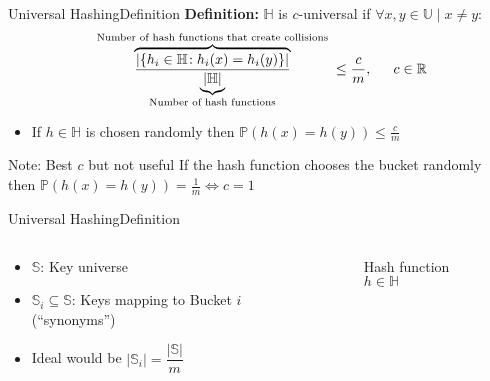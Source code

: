 
\begin{frame}{Universal Hashing}{Definition}
  \textbf{Definition:}
  $\mathbb{H}$ is {\color{Mittel-Blau}$c$-universal} if
  $\forall x, y \in \mathbb{U} \mid x \neq y:$
  \begin{displaymath}
    \overbrace{
      \frac{
        \vert \{h_i \in \mathbb{H}\!: h_i(x) = h_i(y)\} \vert
      }{
      \underbrace{\vert \mathbb{H} \vert}_\text{Number of hash functions}
      }
    }^\text{
      Number of hash functions that create collisions
    }
    \leq \frac{c}{m}, \hspace*{1.5em} c \in \mathbb{R}
  \end{displaymath}
  \begin{itemize}
    \item
      If $h \in \mathbb{H}$ is chosen randomly then
      $\mathbb{P}(h(x) = h(y)) \leq \frac{c}{m}$
  \end{itemize}
  \begin{block}{Note: Best $c$ but not useful}
    If the hash function chooses the {\color{Mittel-Blau}bucket} 
    randomly then
    $\mathbb{P}(h(x) = h(y)) = \frac{1}{m} \Leftrightarrow c = 1$
  \end{block}
\end{frame}


\begin{frame}{Universal Hashing}{Definition}
  \begin{columns}
    \begin{column}{0.5\linewidth}
      \begin{itemize}
        \item
          $\mathbb{S}$:
          Key universe
        \item
          $\mathbb{S}_i \subseteq \mathbb{S}$:
          Keys mapping to Bucket $i$ (\enquote{synonyms})
       \item
         Ideal would be
         $\vert \mathbb{S}_i \vert =\dfrac{\vert \mathbb{S} \vert}{m}$
      \end{itemize}
    \end{column}
    \begin{column}{0.5\linewidth}
      \begin{figure}[!h]%
        \begin{adjustbox}{width=\linewidth}%
        \end{adjustbox}
        \caption{Hash function $h \in \mathbb{H}$}%
        \label{fig:universal_hashing:hash_function_to_bucket}
      \end{figure}
    \end{column}
  \end{columns}
\end{frame}

